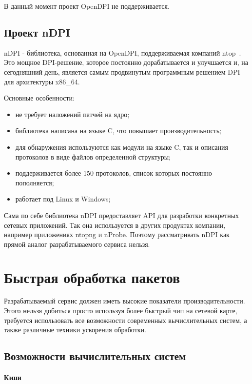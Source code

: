 В данный момент проект OpenDPI не поддерживается.

\subsection{Проект nDPI}
nDPI - библиотека, основанная на OpenDPI, поддерживаемая компаний ntop~\cite{ntop_company}. Это мощное DPI-решение, которое постоянно дорабатывается и улучшается и, на сегодняшний день, является самым продвинутым программным решением DPI для архитектуры x86\_64.

Основные особенности:
\begin{itemize}
\item не требует наложений патчей на ядро;
\item библиотека написана на языке C, что повышает производительность;
\item для обнаружения используются как модули на языке C, так и описания протоколов в виде файлов определенной структуры;
\item поддерживается более 150 протоколов, список которых постоянно пополняется;
\item работает под Linux и Windows;
\end{itemize}

Сама по себе библиотека nDPI предоставляет API для разработки конкретных сетевых приложений. Так она используется в других продуктах компании, например приложениях ntopng и nProbe. Поэтому рассматривать nDPI как прямой аналог разрабатываемого сервиса нельзя.


\section{Быстрая обработка пакетов}
Разрабатываемый сервис должен иметь высокие показатели производительности. Этого нельзя добиться просто используя более быстрый чип на сетевой карте, требуется использовать все возможности современных вычислительных систем, а также различные техники ускорения обработки.

\subsection{Возможности вычислительных систем}
\paragraph{Кэши}

